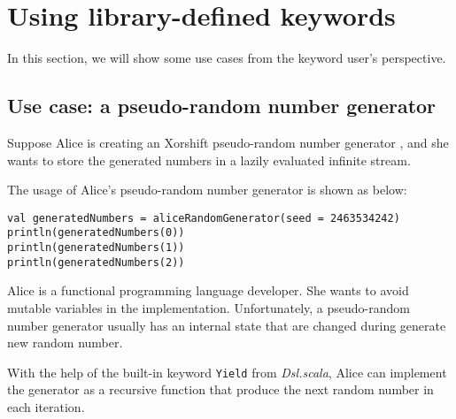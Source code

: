  


\section{Using library-defined keywords}

In this section, we will show some use cases from the keyword user's perspective.

\subsection{Use case: a pseudo-random number generator}

Suppose Alice is creating an Xorshift pseudo-random number generator \cite{marsaglia2003xorshift}, and she wants to store the generated numbers in a lazily evaluated infinite stream. 

The usage of Alice's pseudo-random number generator is shown as below:

\begin{lstlisting}[caption={Using Alice's pseudo-random number generator},label={generatedNumbers}]
val generatedNumbers = aliceRandomGenerator(seed = 2463534242)
println(generatedNumbers(0))
println(generatedNumbers(1))
println(generatedNumbers(2))
\end{lstlisting}

Alice is a functional programming language developer. She wants to avoid mutable variables in the implementation. Unfortunately, a pseudo-random number generator usually has an internal state that are changed during generate new random number.

With the help of the built-in keyword \lstinline{Yield} from \textit{Dsl.scala}, Alice can implement the generator as a recursive function that produce the next random number in each iteration.

